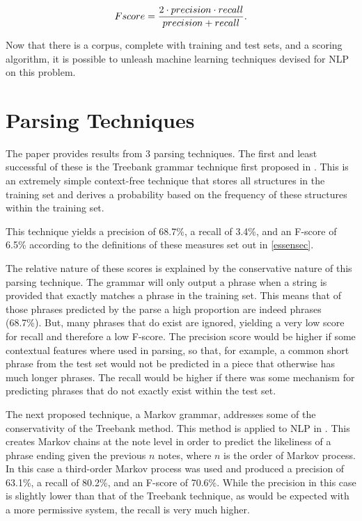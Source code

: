 \documentclass[a4paper,12pt]{article}
\begin{document}
$$ F\-score = \frac{2 \cdot precision \cdot recall}{precision+recall}. $$

Now that there is a corpus, complete with training and test sets, and a scoring algorithm, it is possible to unleash machine learning techniques devised for NLP on this problem.

\section{Parsing Techniques}

The paper provides results from 3 parsing techniques. The first and least successful of these is the Treebank grammar technique first proposed in \cite{Bod93}. This is an extremely simple context-free technique that stores all structures in the training set and derives a probability based on the frequency of these structures within the training set.

This technique yields a precision of 68.7\%, a recall of 3.4\%, and an F-score of 6.5\% according to the definitions of these measures set out in \ref{essensec}.

The relative nature of these scores is explained by the conservative nature of this parsing technique. The grammar will only output a phrase when a string is provided that exactly matches a phrase in the training set. This means that of those phrases predicted by the parse a high proportion are indeed phrases (68.7\%). But, many phrases that do exist are ignored, yielding a very low score for recall and therefore a low F-score. The precision score would be higher if some contextual features where used in parsing, so that, for example, a common short phrase from the test set would not be predicted in a piece that otherwise has much longer phrases. The recall would be higher if there was some mechanism for predicting phrases that do not exactly exist within the test set.

The next proposed technique, a Markov grammar, addresses some of the conservativity of the Treebank method. This method is applied to NLP in \cite{Seneff1992}. This creates Markov chains at the note level in order to predict the likeliness of a phrase ending given the previous $n$ notes, where $n$ is the order of Markov process. In this case a third-order Markov process was used and produced a  precision of 63.1\%, a recall of 80.2\%, and an F-score of 70.6\%. While the precision in this case is slightly lower than that of the Treebank technique, as would be expected with a more permissive system, the recall is very much higher.
\end{document}
